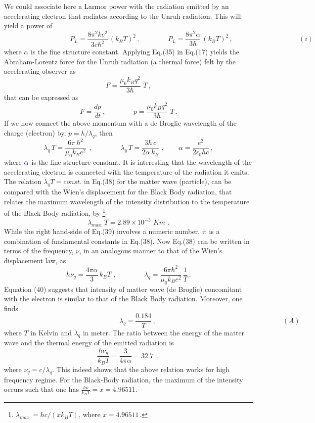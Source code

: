 \documentclass[a4]{epl2}
\begin{document}
We could associate here a Larmor power with the radiation emitted by an accelerating electron that radiates according to the Unruh radiation. This will yield a power of
$$\hspace{4cm}P_L=\frac{8\pi^2ke^2}{3c\hbar^2}\, (k_BT)^2\,,\qquad\qquad P_L=\frac{8\pi^2\alpha}{3\hbar}\, (k_BT)^2\,,\hspace{4cm} (i)$$
where $\alpha$ is the fine structure constant.
Applying Eq.(35) in Eq.(17) yields the Abraham-Lorentz force for the Unruh radiation (a thermal force) felt by the accelerating observer as
\begin{equation}
F=\frac{\mu_0k_Bq^2}{3\hbar}\,\,\dot T\,,
\end{equation}
that can be expressed as
\begin{equation}
F=\frac{dp}{dt}\,,\qquad\qquad p=\frac{\mu_0k_Bq^2}{3\hbar}\,\,T\,.
\end{equation}
If we  now connect the above momentum with a de Broglie wavelength of the charge (electron) by, $p=h/\lambda_q$,  then
\begin{equation}
\lambda_q\, T=\frac{6\pi\,\hbar^2}{\mu_0k_Be^2}\,\,\,, \qquad\qquad \lambda_q\, T=\frac{3\hbar\,c}{2\alpha\, k_B}\,\,,\qquad \alpha=\frac{e^2}{2\epsilon_0hc}\,,
\end{equation}
where $\textcolor[rgb]{0.00,0.00,1.00}{\alpha}$ is the fine structure constant. It is interesting that the wavelength of the accelerating electron is connected with the temperature of the radiation it emits. The relation $\lambda_qT=const.$ in Eq.(38) for the matter wave (particle), can be compared with the Wien's displacement for the Black Body radiation, that relates the maximum wavelength of the intensity  distribution to the temperature of the Black Body radiation, by \footnote{$\lambda_{max.}=hc/(xk_BT)$, where $x=4.96511$\,.}
\begin{equation}
\lambda_{max.}\, T=2.89\times 10^{-3}\, \, K m\,\,.
\end{equation}
While the right hand-side of Eq.(39) involves a numeric number, it is a combination of fundamental constants in Eq.(38).
Now Eq.(38) can be written in terms of the frequency, $\nu$, in an analogous manner to that of the Wien's displacement law, as
\begin{equation}
h\nu_q=\frac{4\pi \alpha}{3}\, k_BT\,\,,\qquad\qquad \lambda_q=\frac{6\pi \hbar^2}{\mu_0k_Be^2}\,\frac{1}{T}\,.
\end{equation}
Equation (40) suggests that intensity of matter wave (de Broglie) concomitant with the electron is similar to that of the Black Body radiation. Moreover, one finds
$$\hspace{7cm}\lambda_q=\frac{0.184}{T}\,, \qquad\qquad \hspace{6cm}(A)$$
where $T$ in Kelvin and $\lambda_q$ in meter.
The ratio between the   energy of the matter wave and the thermal energy of the emitted radiation  is
\begin{equation}
\frac{h\nu_q}{k_BT}=\frac{3}{4\pi \alpha}=32.7\,\,\,,
\end{equation}
where $\nu_q=c/\lambda_q$. This indeed shows that the above relation works for high frequency regime. For the Black-Body radiation, the maximum of the intensity occurs such that one has $\frac{h\nu}{k_BT}=x=4.96511$.
\end{document}
